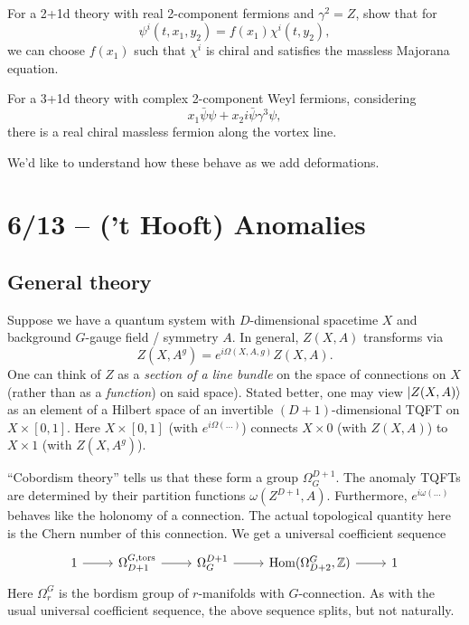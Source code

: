 \begin{exer}
	For a 2+1d theory with real 2-component fermions and $\gamma^2 = Z$, show that for
	\[
		\psi^i(t, x_1, y_2) = f(x_1) \chi^i(t, y_2),
	\]
	we can choose $f(x_1)$ such that $\chi^i$ is chiral and satisfies the massless Majorana equation.
\end{exer}

\begin{exer}
	For a 3+1d theory with complex 2-component Weyl fermions, considering
	\[
		x_1 \bar{\psi} \psi + x_2 i \bar{\psi} \gamma^3 \psi,
	\]
	there is a real chiral massless fermion along the vortex line.
\end{exer}

We'd like to understand how these behave as we add deformations.

\section{6/13 -- ('t Hooft) Anomalies}

\subsection{General theory}

Suppose we have a quantum system with $D$-dimensional spacetime $X$ and background $G$-gauge field / symmetry $A$.
In general, $Z(X, A)$ transforms via
\[
	Z(X, A^g) = e^{i \Omega(X, A, g)} Z(X, A).
\]
One can think of $Z$ as a \emph{section of a line bundle} on the space of connections on $X$ (rather than as a \emph{function}) on said space).
Stated better, one may view $\left|{Z(X, A)}\right\rangle$ as an element of a Hilbert space of an invertible $(D+1)$-dimensional TQFT on $X \times [0, 1]$.
Here $X \times [0, 1]$ (with $e^{i \Omega(\dots)}$) connects $X \times 0$ (with $Z(X, A)$) to $X \times 1$ (with $Z(X, A^g)$).

``Cobordism theory'' tells us that these form a group $\Omega^{D+1}_G$.
The anomaly TQFTs are determined by their partition functions $\omega(Z^{D+1}, A)$.
Furthermore, $e^{i \omega(\dots)}$ behaves like the holonomy of a connection.
The actual topological quantity here is the Chern number of this connection.
We get a universal coefficient sequence
\[
	\begin{tikzcd}
		1 \rar & \Omega_{D+1}^{G,\mathrm{tors}} \rar & \Omega^{D+1}_G \rar & \Hom(\Omega_{D+2}^G, \ZZ) \rar & 1
	\end{tikzcd}
\]
Here $\Omega_r^G$ is the bordism group of $r$-manifolds with $G$-connection.
As with the usual universal coefficient sequence, the above sequence splits, but not naturally.

